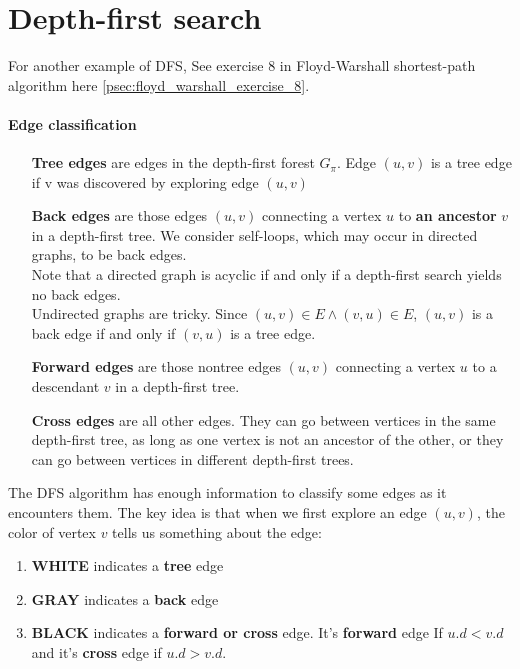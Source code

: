 \documentclass{book}
\begin{document}
	\section{Depth-first search}
	For another example of DFS, See exercise 8 in Floyd-Warshall shortest-path algorithm here \ref{psec:floyd_warshall_exercise_8}.
	\label{psec:EdgeClassification}	
	\paragraph{Edge classification}
	\begin{itemize}
	\item[\textbf{Tree edges}] are edges in the depth-first forest $G_\pi$. Edge $(u, v)$ is a tree edge if v was discovered by exploring edge $(u, v)$
	\item[\textbf{Back edges}] are those edges $(u, v)$ connecting a vertex $u$ to \textbf{an ancestor} $v$ in a depth-first tree. We consider self-loops, which may occur in directed graphs, to be back edges.\\
	Note that a directed graph is acyclic if and only if a depth-first search yields no back edges.\\
	
	Undirected graphs are tricky. Since $(u, v) \in E \land (v, u) \in E$, $(u, v)$ is a back edge if and only if $(v, u)$ is a tree edge.
	\item[\textbf{Forward edges}] are those nontree edges $(u, v)$ connecting a vertex $u$ to a descendant $v$ in a depth-first tree.
	\item[\textbf{Cross edges}] are all other edges. They can go between vertices in the same depth-first tree, as long as one vertex is not an ancestor of the other, or they can go between vertices in different depth-first trees.
	\end{itemize}
	The DFS algorithm has enough information to classify some edges as it encounters them. The key idea is that when we first explore an edge $(u, v)$, the color of vertex $v$ tells us something about the edge:
	\begin{enumerate}
	\item \textbf{WHITE} indicates a \textbf{tree} edge
	\item \textbf{GRAY} indicates a \textbf{back} edge
	\item \textbf{BLACK} indicates a \textbf{forward or cross} edge. It's \textbf{forward} edge If $u.d < v.d$ and it's \textbf{cross} edge if $u.d > v.d$.
	\end{enumerate}
\end{document}
